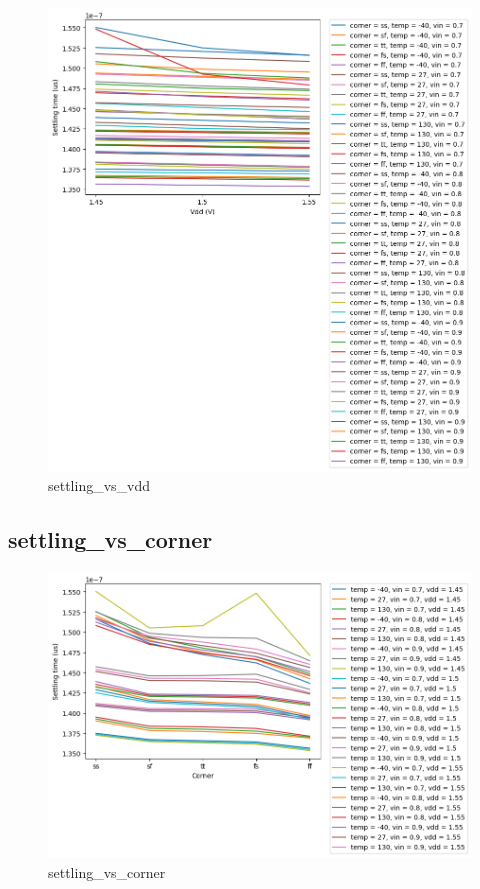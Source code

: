 \documentclass[
  a4paper,
  DIV=11,
  numbers=noendperiod]{scrartcl}
\begin{document}
\begin{tcolorbox}
\begin{figure}[H]
{\centering \includegraphics{./cace/_docs/ota-5t/schematic/settling_vs_vdd.png}

}

\caption{settling\_vs\_vdd}

\end{figure}%

\subsection{settling\_vs\_corner}\label{settling_vs_corner}

\begin{figure}[H]

{\centering \includegraphics{./cace/_docs/ota-5t/schematic/settling_vs_corner.png}

}

\caption{settling\_vs\_corner}

\end{figure}%

\end{tcolorbox}
\end{document}

